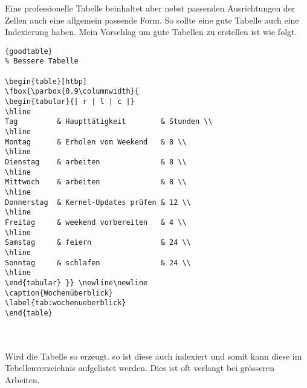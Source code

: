 \noindent
Eine professionelle Tabelle beinhaltet aber nebst passenden
Ausrichtungen der Zellen auch eine allgemein passende Form.
So sollte eine gute Tabelle auch eine Indexierung haben.
Mein Vorschlag um gute Tabellen zu erstellen ist wie folgt.

\begin{center}
\begin{lstlisting}[caption=Bessere Tebelle]{goodtable}
% Bessere Tabelle

\begin{table}[htbp]
\fbox{\parbox{0.9\columnwidth}{
\begin{tabular}{| r | l | c |}
\hline
Tag         & Haupttätigkeit        & Stunden \\
\hline
Montag      & Erholen vom Weekend   & 8 \\
\hline
Dienstag    & arbeiten              & 8 \\
\hline
Mittwoch    & arbeiten              & 8 \\
\hline
Donnerstag  & Kernel-Updates prüfen & 12 \\
\hline
Freitag     & weekend vorbereiten   & 4 \\
\hline
Samstag     & feiern                & 24 \\
\hline
Sonntag     & schlafen              & 24 \\
\hline
\end{tabular} }} \newline\newline
\caption{Wochenüberblick}
\label{tab:wochenueberblick}
\end{table}
\end{lstlisting}
\end{center}


\begin{table}[htbp]
\centering
{} \newline\newline
\caption{Wochenüberblick}
\label{tab:wochenueberblick}
\end{table}\\\\

\noindent
Wird die Tabelle so erzeugt. so ist diese auch indexiert
und somit kann diese im Tebellenverzeichnis aufgelistet
werden. Dies ist oft verlangt bei grösseren Arbeiten.
